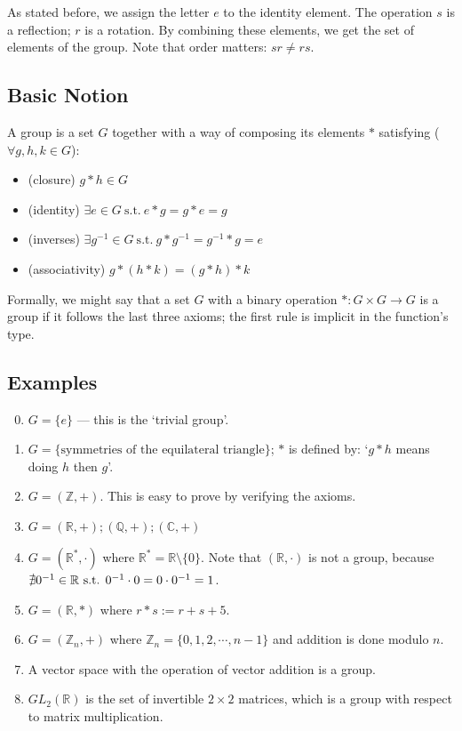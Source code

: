 \documentclass{article}
\begin{document}
As stated before, we assign the letter $e$ to the identity element. The operation $s$ is a reflection; $r$ is a rotation. By combining these elements, we get the set of elements of the group. Note that order matters: $sr\neq rs$.

\subsection{Basic Notion}
\begin{definition}[Group]
    A group is a set $G$ together with a way of composing its elements $\ast$ satisfying ($\forall g, h, k \in G$):
    \begin{itemize}
        \item (closure) $g \ast h \in G$
        \item (identity) $\exists e \in G \mathrm{\ s.t.\ } e \ast g = g \ast e = g$
        \item (inverses) $\exists g^{-1} \in G \mathrm{\ s.t.\ } g \ast g^{-1} = g^{-1} \ast g = e$
        \item (associativity) $g \ast (h \ast k) = (g \ast h) \ast k$
    \end{itemize}
\end{definition}

Formally, we might say that a set $G$ with a binary operation $\ast : G \times G \to G$ is a group if it follows the last three axioms; the first rule is implicit in the function's type.

\subsection{Examples}
\begin{enumerate}
    \setcounter{enumi}{-1}
    \item $G = \{ e \}$ --- this is the `trivial group'.
    \item $G = \{ \text{symmetries of the equilateral triangle} \} $; $\ast$ is defined by: `$g \ast h$ means doing $h$ then $g$'.
    \item $G = (\mathbb Z, +)$. This is easy to prove by verifying the axioms.
    \item $G = (\mathbb R, +); (\mathbb Q, +); (\mathbb C, +)$
    \item $G = (\mathbb R^*, \cdot)$ where $\mathbb R^* = \mathbb R \setminus \{ 0\}$. Note that $(\mathbb R, \cdot)$ is not a group, because $\nexists 0^{-1} \in \mathbb R \text{ s.t. } 0^{-1} \cdot 0 = 0 \cdot 0^{-1} = 1$.
    \item $G = (\mathbb R, \ast)$ where $r \ast s := r + s + 5$.
    \item $G = (\mathbb Z_n, +)$ where $\mathbb Z_n = \{ 0, 1, 2, \cdots, n-1 \}$ and addition is done modulo $n$.
    \item A vector space with the operation of vector addition is a group.
    \item $GL_2(\mathbb R)$ is the set of invertible $2\times 2$ matrices, which is a group with respect to matrix multiplication.
\end{enumerate}
\end{document}
